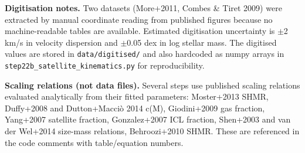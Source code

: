 \documentclass[11pt,a4paper]{article}
\begin{document}
\textbf{Digitisation notes.} Two datasets (More+2011, Combes \& Tiret 2009) were extracted by manual coordinate reading from published figures because no machine-readable tables are available. Estimated digitisation uncertainty is $\pm$2 km/\allowbreak{}s in velocity dispersion and $\pm$0.05 dex in log stellar mass. The digitised values are stored in \texttt{data/\allowbreak{}digitised/\allowbreak{}} and also hardcoded as numpy arrays in \texttt{step22b\_\allowbreak{}satellite\_\allowbreak{}kinematics.py} for reproducibility.

\textbf{Scaling relations (not data files).} Several steps use published scaling relations evaluated analytically from their fitted parameters: Moster+2013 SHMR, Duffy+2008 and Dutton+Macci\`o 2014 c(M), Giodini+2009 gas fraction, Yang+2007 satellite fraction, Gonzalez+2007 ICL fraction, Shen+2003 and van der Wel+2014 size-mass relations, Behroozi+2010 SHMR. These are referenced in the code comments with table/\allowbreak{}equation numbers.
\end{document}
